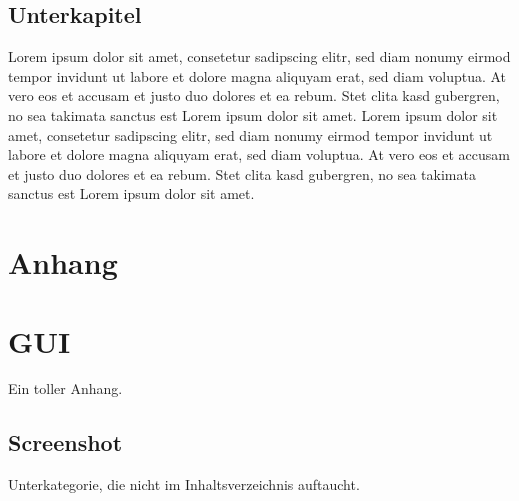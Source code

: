 \documentclass[12pt,a4paper,bibliography=totocnumbered,listof=totocnumbered]{article}
\begin{document}
\subsection{Unterkapitel}
Lorem ipsum dolor sit amet, consetetur sadipscing elitr, sed diam nonumy eirmod tempor invidunt ut labore et dolore magna aliquyam erat, sed diam voluptua. At vero eos et accusam et justo duo dolores et ea rebum. Stet clita kasd gubergren, no sea takimata sanctus est Lorem ipsum dolor sit amet. Lorem ipsum dolor sit amet, consetetur sadipscing elitr, sed diam nonumy eirmod tempor invidunt ut labore et dolore magna aliquyam erat, sed diam voluptua. At vero eos et accusam et justo duo dolores et ea rebum. Stet clita kasd gubergren, no sea takimata sanctus est Lorem ipsum dolor sit amet.
\pagebreak

\renewcommand\refname{Quellenverzeichnis}


\pagebreak

\setcounter{page}{1}

\begin{appendix}
\section*{Anhang}
{}

\section{GUI}
Ein toller Anhang.

\subsection*{Screenshot}
\label{app:screenshot}
Unterkategorie, die nicht im Inhaltsverzeichnis auftaucht.

\end{appendix}
\end{document}
